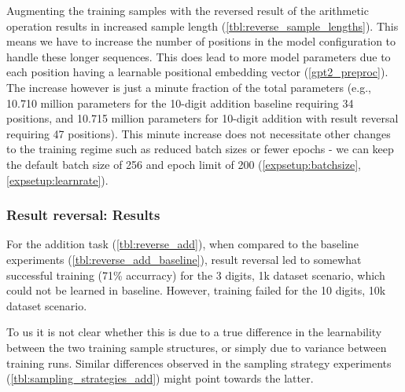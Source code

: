 Augmenting the training samples with the reversed result of the arithmetic operation results in increased sample length (\cref{tbl:reverse_sample_lengths}).
This means we have to increase the number of positions in the model configuration to handle these longer sequences. This does lead to more model parameters due to each position having a learnable positional embedding vector (\cref{gpt2_preproc}). The increase however is just a minute fraction of the total parameters (e.g., 10.710 million parameters for the 10-digit addition baseline requiring 34 positions, and 10.715 million parameters for 10-digit addition with result reversal requiring 47 positions). This minute increase does not necessitate other changes to the training regime such as reduced batch sizes or fewer epochs - we can keep the default batch size of 256 and epoch limit of 200 (\cref{expsetup:batchsize}, \cref{expsetup:learnrate}).

\subsubsection{Result reversal: Results}

\begin{table}[H]
	\begin{minipage}[t]{0.47\linewidth}
		\hfill
		\label{tbl:reverse_add}
	\end{minipage}
	\hfill %
	\begin{minipage}[t]{0.47\linewidth}
		\hfill
		\label{tbl:reverse_add_baseline}
	\end{minipage}
\end{table}

For the addition task (\cref{tbl:reverse_add}), when compared to the baseline experiments (\cref{tbl:reverse_add_baseline}), result reversal led to somewhat successful training (71\% accurracy) for the 3 digits, 1k dataset scenario, which could not be learned in baseline. However, training failed for the 10 digits, 10k dataset scenario.

To us it is not clear whether this is due to a true difference in the learnability between the two training sample structures, or simply due to variance between training runs. Similar differences observed in the sampling strategy experiments (\cref{tbl:sampling_strategies_add}) might point towards the latter.

